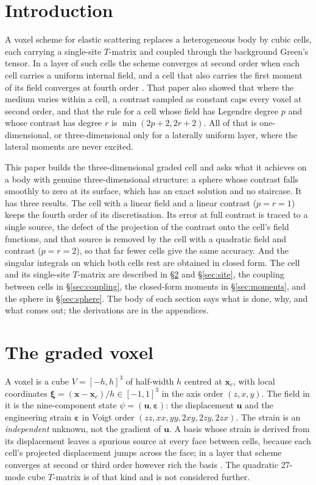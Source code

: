 \documentclass[11pt,a4paper]{article}
\begin{document}
\section{Introduction}\label{sec:intro}

A voxel scheme for elastic scattering replaces a heterogeneous body by cubic cells, each carrying a
single-site $T$-matrix and coupled through the background Green's tensor. In a layer of such cells the
scheme converges at second order when each cell carries a uniform internal field, and a cell that also
carries the first moment of its field converges at fourth order \citep{NestorError2026}. That paper
also showed that where the medium varies within a cell, a contrast sampled as constant caps every
voxel at second order, and that the rule for a cell whose field has Legendre degree $p$ and whose
contrast has degree $r$ is $\min(2p+2,2r+2)$. All of that is one-dimensional, or three-dimensional only
for a laterally uniform layer, where the lateral moments are never excited.

This paper builds the three-dimensional graded cell and asks what it achieves on a body with genuine
three-dimensional structure: a sphere whose contrast falls smoothly to zero at its surface, which has an
exact solution and no staircase. It has three results. The cell with a linear field and a linear contrast
($p=r=1$) keeps the fourth order of its discretisation. Its error at full contrast is traced to a single
source, the defect of the projection of the contrast onto the cell's field functions, and that source is
removed by the cell with a quadratic field and contrast ($p=r=2$), so that far fewer cells give the same
accuracy. And the singular integrals on which both cells rest are obtained in closed form. The cell and
its single-site $T$-matrix are described in \S\ref{sec:voxel} and \S\ref{sec:site}, the coupling between
cells in \S\ref{sec:coupling}, the closed-form moments in \S\ref{sec:moments}, and the sphere in
\S\ref{sec:sphere}. The body of each section says what is done, why, and what comes out; the derivations are
in the appendices.

\section{The graded voxel}\label{sec:voxel}

A voxel is a cube $V=[-h,h]^3$ of half-width $h$ centred at $\mathbf{x}_c$, with local coordinates
$\boldsymbol{\xi}=(\mathbf{x}-\mathbf{x}_c)/h\in[-1,1]^3$ in the axis order $(z,x,y)$. The field in it is the
nine-component state $\psi=(\mathbf{u},\boldsymbol{\varepsilon})$: the displacement $\mathbf{u}$ and the
engineering strain $\boldsymbol{\varepsilon}$ in Voigt order $(zz,xx,yy,2xy,2zy,2zx)$. The strain is an
\emph{independent} unknown, not the gradient of $\mathbf{u}$. A basis whose strain is derived from its
displacement leaves a spurious source at every face between cells, because each cell's projected
displacement jumps across the face; in a layer that scheme converges at second or third order however
rich the basis \citep{NestorError2026}. The quadratic 27-mode cube $T$-matrix is of that kind and is
not considered further.
\end{document}
